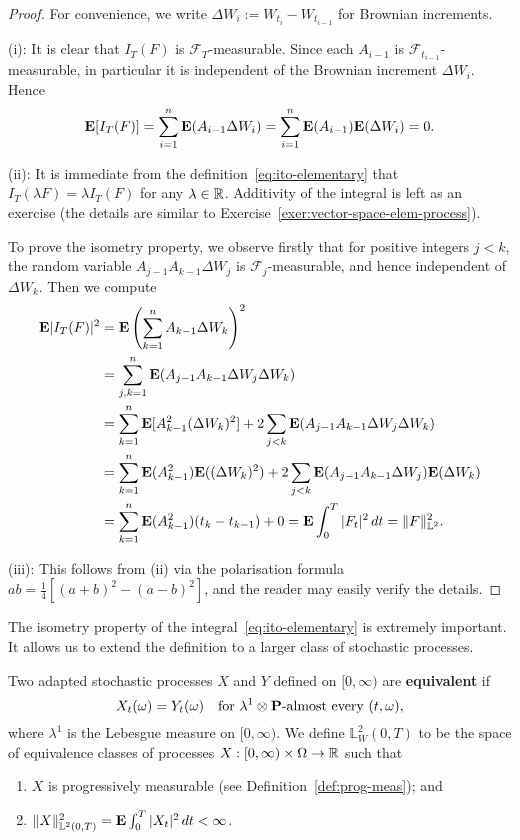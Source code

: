 \begin{proof}
For convenience, we write $\Delta W_i := W_{t_i}-W_{t_{i-1}}$ for Brownian increments.

(i): It is clear that $I_T(F)$ is $\mathcal{F}_T$-measurable. Since each $A_{i-1}$ is $\mathcal{F}_{t_{i-1}}$-measurable, in particular it is independent of the Brownian increment $\Delta W_i$. Hence
\begin{equation*}
    \mathbf{E}[I_T(F)] = \sum_{i=1}^n \mathbf{E}(A_{i-1}\Delta W_i) = \sum_{i=1}^n \mathbf{E}(A_{i-1})\mathbf{E}(\Delta W_i) = 0.
\end{equation*}

(ii): It is immediate from the definition~\eqref{eq:ito-elementary} that $I_T(\lambda F)=\lambda I_T(F)$ for any $\lambda\in\mathbb{R}$. Additivity of the integral is left as an exercise (the details are similar to Exercise~\ref{exer:vector-space-elem-process}).

To prove the isometry property, we observe firstly that for positive integers $j<k$, the random variable $A_{j-1}A_{k-1}\Delta W_j$ is $\mathcal{F}_j$-measurable, and hence independent of $\Delta W_k$. Then we compute
\begin{align*}
    \mathbf{E}|I_T(F)|^2 &= \mathbf{E}\left( \sum_{k=1}^n A_{k-1}\Delta W_k \right)^2 \\
    &= \sum_{j,k=1}^n \mathbf{E}(A_{j-1}A_{k-1}\Delta W_j \Delta W_k) \\
    &= \sum_{k=1}^n \mathbf{E}[A_{k-1}^2 (\Delta W_k)^2] + 2\sum_{j<k}\mathbf{E}(A_{j-1}A_{k-1}\Delta W_j \Delta W_k) \\
    &= \sum_{k=1}^n \mathbf{E}(A_{k-1}^2) \mathbf{E}((\Delta W_k)^2) + 2\sum_{j<k}\mathbf{E}(A_{j-1}A_{k-1}\Delta W_j)\mathbf{E}(\Delta W_k) \\
    &= \sum_{k=1}^n \mathbf{E}(A_{k-1}^2)(t_k-t_{k-1}) + 0 = \mathbf{E}\int_0^T |F_t|^2\,dt = \|F\|^2_{\mathbb{L}^2}.
\end{align*}

(iii): This follows from (ii) via the polarisation formula $ab = \frac{1}{4}[(a+b)^2 - (a-b)^2]$, and the reader may easily verify the details.
\end{proof}

The isometry property of the integral~\eqref{eq:ito-elementary} is extremely important. It allows us to extend the definition to a larger class of stochastic processes.
\begin{definition}
    Two adapted stochastic processes $X$ and $Y$ defined on $[0,\infty)$ are \textbf{equivalent} if
    \begin{equation*}
        X_t(\omega)=Y_t(\omega) \quad\text{for $\lambda^1\otimes\mathbf{P}$-almost every }(t,\omega),
    \end{equation*}
    where $\lambda^1$ is the Lebesgue measure on $[0,\infty)$. We define $\mathbb{L}^2_W(0,T)$ to be the space of equivalence classes of processes $X:[0,\infty)\times\Omega\to\mathbb{R}$ such that
    \begin{enumerate}[\upshape (i)]
        \item $X$ is progressively measurable (see Definition~\ref{def:prog-meas}); and
        \item $\|X\|^2_{\mathbb{L}^2(0,T)} = \mathbf{E}\int_0^T |X_t|^2\,dt <\infty$.
    \end{enumerate}
\end{definition}

